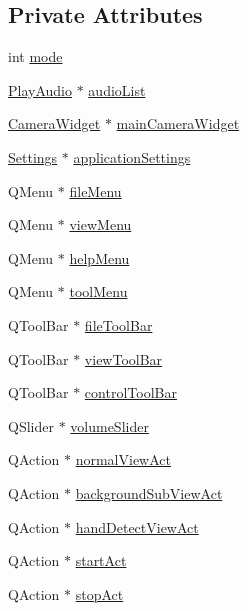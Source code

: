 \subsection*{Private Attributes}
\begin{DoxyCompactItemize}
\item 
int \hyperlink{classMainWindow_a0d680234c97ecdc151020dd0ec09cc54}{mode}
\item 
\hyperlink{classPlayAudio}{PlayAudio} $\ast$ \hyperlink{classMainWindow_a662b41536f24ae8944b1fcd7c3c61d65}{audioList}
\item 
\hyperlink{classCameraWidget}{CameraWidget} $\ast$ \hyperlink{classMainWindow_a8a71bdff27e71941a425a96a795443b5}{mainCameraWidget}
\item 
\hyperlink{classSettings}{Settings} $\ast$ \hyperlink{classMainWindow_ac0a6beb7a11b29e341674239c41cec24}{applicationSettings}
\item 
QMenu $\ast$ \hyperlink{classMainWindow_a426da48f6e2f865b07a28533c07c4f7a}{fileMenu}
\item 
QMenu $\ast$ \hyperlink{classMainWindow_a6e38d7c63a3dc537d05eafe7e0f5f4db}{viewMenu}
\item 
QMenu $\ast$ \hyperlink{classMainWindow_a947c15e520bfea60338b2577f67146b8}{helpMenu}
\item 
QMenu $\ast$ \hyperlink{classMainWindow_a4afb06b5d9499439b9fd9d3814b0a356}{toolMenu}
\item 
QToolBar $\ast$ \hyperlink{classMainWindow_a0a352c6d66b7a080fcf558874a7e51d4}{fileToolBar}
\item 
QToolBar $\ast$ \hyperlink{classMainWindow_a246eb90b537ed23265d2dbffcc066aa8}{viewToolBar}
\item 
QToolBar $\ast$ \hyperlink{classMainWindow_aaee0e9ded4637c7fc4ad339712d95986}{controlToolBar}
\item 
QSlider $\ast$ \hyperlink{classMainWindow_afb5e35a5e0a66f1054aaa700829d6ff4}{volumeSlider}
\item 
QAction $\ast$ \hyperlink{classMainWindow_add80706af3d1f3bc4cfa7580b0cbea6d}{normalViewAct}
\item 
QAction $\ast$ \hyperlink{classMainWindow_ac5c06b305f10f9ab46b320e15bcf2255}{backgroundSubViewAct}
\item 
QAction $\ast$ \hyperlink{classMainWindow_ac2f865b7d3f7d72aba7f76281528c3d3}{handDetectViewAct}
\item 
QAction $\ast$ \hyperlink{classMainWindow_a88a89355c71689ae45113472ffe084ee}{startAct}
\item 
QAction $\ast$ \hyperlink{classMainWindow_a09f007c020624ddc5d390df40803467b}{stopAct}

\end{DoxyCompactItemize}
